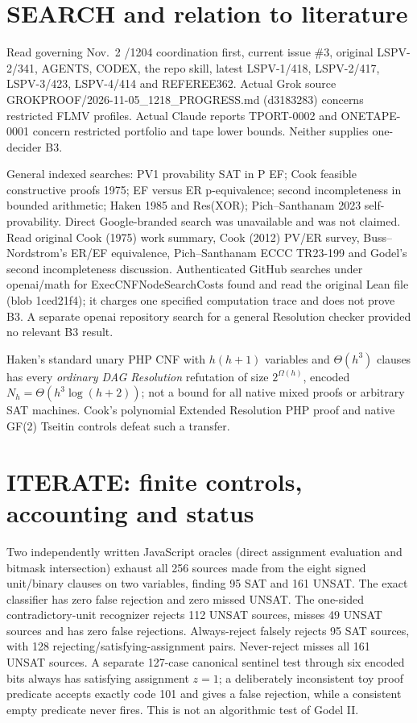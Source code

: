 \documentclass[11pt]{article}
\begin{document}
\section{SEARCH and relation to literature}
Read governing Nov.\ 2 /1204 coordination first, current issue \#3, original LSPV-2/341, AGENTS, CODEX, the repo skill, latest LSPV-1/418, LSPV-2/417, LSPV-3/423, LSPV-4/414 and REFEREE362. Actual Grok source GROKPROOF/2026-11-05\_1218\_PROGRESS.md (d3183283) concerns restricted FLMV profiles. Actual Claude reports TPORT-0002 and ONETAPE-0001 concern restricted portfolio and tape lower bounds. Neither supplies one-decider B3.

General indexed searches: PV1 provability SAT in P EF; Cook feasible constructive proofs 1975; EF versus ER p-equivalence; second incompleteness in bounded arithmetic; Haken 1985 and Res(XOR); Pich--Santhanam 2023 self-provability. Direct Google-branded search was unavailable and was not claimed. Read original Cook (1975) work summary, Cook (2012) PV/ER survey, Buss--Nordstrom's ER/EF equivalence, Pich--Santhanam ECCC TR23-199 and Godel's second incompleteness discussion. Authenticated GitHub searches under openai/math for ExecCNFNodeSearchCosts found and read the original Lean file (blob 1ced21f4); it charges one specified computation trace and does not prove B3. A separate openai repository search for a general Resolution checker provided no relevant B3 result.

Haken's standard unary PHP CNF with $h(h+1)$ variables and $\Theta(h^3)$ clauses has every \emph{ordinary DAG Resolution} refutation of size $2^{\Omega(h)}$, encoded $N_h=\Theta(h^3\log(h+2))$; not a bound for all native mixed proofs or arbitrary SAT machines. Cook's polynomial Extended Resolution PHP proof and native GF(2) Tseitin controls defeat such a transfer.

\section{ITERATE: finite controls, accounting and status}
Two independently written JavaScript oracles (direct assignment evaluation and bitmask intersection) exhaust all 256 sources made from the eight signed unit/binary clauses on two variables, finding 95 SAT and 161 UNSAT. The exact classifier has zero false rejection and zero missed UNSAT. The one-sided contradictory-unit recognizer rejects 112 UNSAT sources, misses 49 UNSAT sources and has zero false rejections. Always-reject falsely rejects 95 SAT sources, with 128 rejecting/satisfying-assignment pairs. Never-reject misses all 161 UNSAT sources. A separate 127-case canonical sentinel test through six encoded bits always has satisfying assignment $z=1$; a deliberately inconsistent toy proof predicate accepts exactly code 101 and gives a false rejection, while a consistent empty predicate never fires. This is not an algorithmic test of Godel II.
\end{document}
